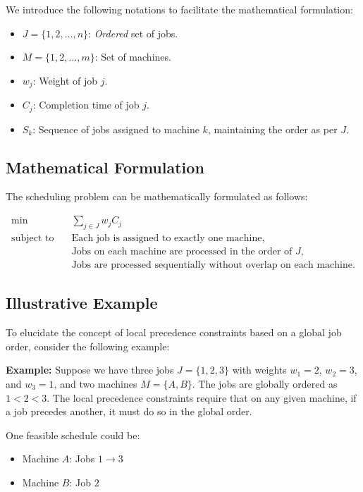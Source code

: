 We introduce the following notations to facilitate the mathematical formulation:

\begin{itemize}
    \item $J = \{1, 2, \dots, n\}$: \emph{Ordered} set of jobs.
    \item $M = \{1, 2, \dots, m\}$: Set of machines.
    \item $w_j$: Weight of job $j$.
    \item $C_j$: Completion time of job $j$.
    \item $S_k$: Sequence of jobs assigned to machine $k$, maintaining the order as per $J$.
\end{itemize}

\subsection{Mathematical Formulation}

The scheduling problem can be mathematically formulated as follows:

\begin{align*}
    \min \quad & \sum_{j \in J} w_j C_j \\
    \text{subject to} \quad & \text{Each job is assigned to exactly one machine}, \\
    & \text{Jobs on each machine are processed in the order of } J, \\
    & \text{Jobs are processed sequentially without overlap on each machine}.
\end{align*}

\subsection{Illustrative Example}

To elucidate the concept of local precedence constraints based on a global job order, consider the following example:

\textbf{Example:} Suppose we have three jobs $J = \{1, 2, 3\}$ with weights $w_1 = 2$, $w_2 = 3$, and $w_3 = 1$, and two machines $M = \{A, B\}$. The jobs are globally ordered as $1 < 2 < 3$. The local precedence constraints require that on any given machine, if a job precedes another, it must do so in the global order.

One feasible schedule could be:

\begin{itemize}
    \item Machine $A$: Jobs $1 \rightarrow 3$
    \item Machine $B$: Job $2$
\end{itemize}

